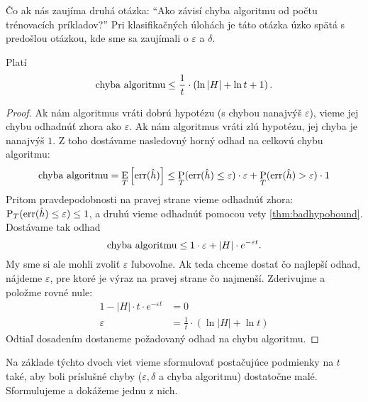 Čo ak nás zaujíma druhá otázka: ``Ako závisí chyba algoritmu od počtu
trénovacích príkladov?'' Pri klasifikačných úlohách je táto otázka úzko
spätá s predošlou otázkou, kde sme sa zaujímali o $\varepsilon$ a $\delta$.

\begin{theorem}
  Platí
  $$ \text{\normalfont chyba algoritmu} \leq \frac{1}{t} \cdot \left( \ln{|H|} + \ln{t} + 1 \right). $$
\end{theorem}
\begin{proof}
  Ak nám algoritmus vráti dobrú hypotézu (s chybou nanajvýš $\varepsilon$),
  vieme jej chybu odhadnúť zhora ako $\varepsilon$. Ak nám algoritmus vráti
  zlú hypotézu, jej chyba je nanajvýš $1$. Z toho dostávame nasledovný
  horný odhad na celkovú chybu algoritmu:
  $$ \text{\normalfont chyba algoritmu} = \operatorname*{\mathrm{E}}_T \left[ \mathrm{err}(\hat{h}) \right] \leq \operatorname*{\mathrm{P}}_T(\mathrm{err}(\hat{h}) \leq \varepsilon) \cdot \varepsilon + \operatorname*{\mathrm{P}}_T(\mathrm{err}(\hat{h}) > \varepsilon) \cdot 1$$
  Pritom pravdepodobnosti na pravej strane vieme odhadnúť zhora:
  $\operatorname*{\mathrm{P}}_T(\mathrm{err}(\hat{h}) \leq \varepsilon) \leq 1$, a druhú vieme
  odhadnúť pomocou vety \ref{thm:badhypobound}. Dostávame tak odhad
  $$ \text{\normalfont chyba algoritmu} \leq 1 \cdot \varepsilon + |H| \cdot e^{-\varepsilon t}. $$
  My sme si ale mohli zvoliť $\varepsilon$ ľubovoľne. Ak teda chceme
  dostať čo najlepší odhad, nájdeme $\varepsilon$, pre ktoré je výraz
  na pravej strane čo najmenší. Zderivujme a položme rovné nule:
  \begin{align}
    1 - |H| \cdot t \cdot e^{-\varepsilon t} &= 0 \\
    \varepsilon &= \frac{1}{t} \cdot \left( \ln{|H|} + \ln{t} \right)
  \end{align}
  Odtiaľ dosadením dostaneme požadovaný odhad na chybu algoritmu.
\end{proof}

Na základe týchto dvoch viet vieme sformulovať postačujúce podmienky
na $t$ také, aby boli príslušné chyby ($\varepsilon, \delta$ a chyba
algoritmu) dostatočne malé. Sformulujeme a dokážeme jednu z nich.


